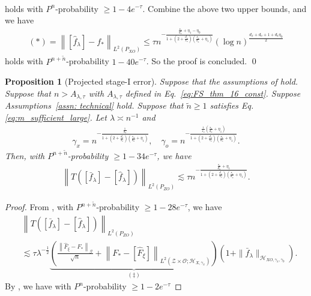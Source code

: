 \documentclass[11pt]{article}
\newcommand{\stageonesamples}{\tilde{n}}
\newcommand{\calZ}{\mathcal{Z}}
\newcommand{\calH}{\mathcal{H}}
\newcommand{\calG}{\mathcal{G}}
\newcommand{\calO}{\mathcal{O}}
\newcommand{\0}{\mathbf{0}}
\newtheorem{prop}{Proposition}[section]
\begin{document}
\begin{appendix}
\begin{align*}
\end{align*}
holds with $P^n$-probability $\geq 1 - 4e^{-\tau}$. Combine the above two upper bounds, and we have
\begin{align}
\label{eq:eq_to_refer_main_pf_sketch_final}
     (\ast) = \left\|\left[\hat{f}_{\lambda}\right] - f_{\ast}\right\|_{L^2(P_{XO})} \leq \tau n^{-\frac{\frac{s_x}{d_x}+\eta_1-\eta_0}{1+(2+\frac{d_o}{s_o})(\frac{s_x}{d_x}+\eta_1)}} (\log n)^{\frac{d_x+d_o+1 + d_x\eta_0}{2}}
\end{align}
holds with $P^{n+\stageonesamples}$-probability $1 - 40e^{-\tau}$.  So the proof is concluded.
\qed


\begin{prop}[Projected stage-I error]
\label{prop:projected_stage_one}
Suppose that the assumptions of  hold. Suppose that $n > A_{\lambda,\tau}$ with $A_{\lambda,\tau}$ defined in Eq.~\eqref{eq:FS_thm_16_const}. Suppose Assumptions~\ref{assn: technical} hold.  Suppose that $\stageonesamples \geq 1$ satisfies Eq. \eqref{eq:m_sufficient_large}. Let $\lambda \asymp n^{-1}$ and 
\begin{align*}
    \gamma_x = n^{-\frac{\frac{1}{d_x}}{1+(2+\frac{d_o}{s_o})(\frac{s_x}{d_x}+\eta_1)}}, \quad \gamma_o = n^{-\frac{\frac{1}{s_o}(\frac{s_x}{d_x}+\eta_1)}{1+(2+\frac{d_o}{s_o})(\frac{s_x}{d_x}+\eta_1)}}. 
\end{align*} Then, with $P^{n+\stageonesamples}$-probability $\geq 1-  34e^{-\tau}$, we have
\begin{align*}
    \left\|T\left(\left[\bar{f}_{\lambda}\right] - \left[\hat{f}_{\lambda}\right]\right)\right\|_{L^2(P_{ZO})} \lesssim \tau n^{-\frac{\frac{s_x}{d_x}+\eta_1}{1+(2+\frac{d_o}{s_o})(\frac{s_x}{d_x}+\eta_1)}} .
\end{align*}
\end{prop}
\begin{proof}
From , with $P^{n+\stageonesamples}$-probability $\geq 1 - 28e^{-\tau}$, we have
\begin{align*}
    &\left\|T\left(\left[\bar{f}_{\lambda}\right] - \left[\hat{f}_{\lambda}\right]\right)\right\|_{L^2(P_{ZO})}\\ &\lesssim \tau \lambda^{-\frac{1}{2}} \underbrace{\left(\frac{\left\|\hat{F}_{\xi}-F_*\right\|_{\calG}}{\sqrt{n}}+\left\|F_*-[\hat{F}_{\xi}] \right\|_{L^2\left(\calZ\times\calO; \mathcal{H}_{X,\gamma_x}\right)} \right)}_{(\ddag)} \left(1 + \|\bar{f}_{\lambda}\|_{\calH_{XO, \gamma_x, \gamma_0}}\right) .
\end{align*}
By , we have with $P^n$-probability $\geq 1 - 2e^{-\tau}$

\end{proof}
\end{appendix}
\end{document}
